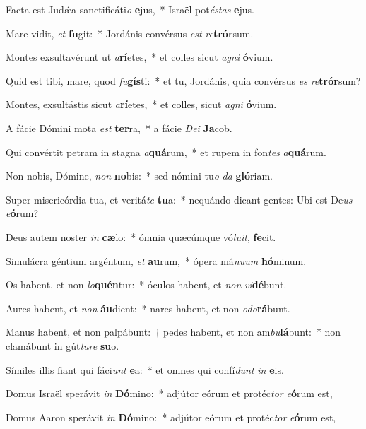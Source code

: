 \item Facta est Judǽa sanctificáti\textit{o} \textbf{e}jus,~* Israël pot\textit{és}\textit{tas} \textbf{e}jus.
\item Mare vidit, \textit{et} \textbf{fu}git:~* Jordánis convérsus \textit{est} \textit{re}\textbf{trór}sum.
\item Montes exsultavérunt ut \textit{a}\textbf{rí}etes,~* et colles sicut \textit{a}\textit{gni} \textbf{ó}vium.
\item Quid est tibi, mare, quod \textit{fu}\textbf{gís}ti:~* et tu, Jordánis, quia convérsus \textit{es} \textit{re}\textbf{trór}sum?
\item Montes, exsultástis sicut \textit{a}\textbf{rí}etes,~* et colles, sicut \textit{a}\textit{gni} \textbf{ó}vium.
\item A fácie Dómini mota \textit{est} \textbf{ter}ra,~* a fácie \textit{De}\textit{i} \textbf{Ja}cob.
\item Qui convértit petram in stagna \textit{a}\textbf{quá}rum,~* et rupem in fon\textit{tes} \textit{a}\textbf{quá}rum.
\item Non nobis, Dómine, \textit{non} \textbf{no}bis:~* sed nómini tu\textit{o} \textit{da} \textbf{gló}riam.
\item Super misericórdia tua, et veritá\textit{te} \textbf{tu}a:~* nequándo dicant gentes: Ubi est De\textit{us} \textit{e}\textbf{ó}rum?
\item Deus autem noster \textit{in} \textbf{cæ}lo:~* ómnia quæcúmque vó\textit{lu}\textit{it}, \textbf{fe}cit.
\item Simulácra géntium argéntum, \textit{et} \textbf{au}rum,~* ópera má\textit{nu}\textit{um} \textbf{hó}minum.
\item Os habent, et non \textit{lo}\textbf{quén}tur:~* óculos habent, et \textit{non} \textit{vi}\textbf{dé}bunt.
\item Aures habent, et \textit{non} \textbf{áu}dient:~* nares habent, et non \textit{o}\textit{do}\textbf{rá}bunt.
\item Manus habent, et non palpábunt:~† pedes habent, et non am\textit{bu}\textbf{lá}bunt:~* non clamábunt in gút\textit{tu}\textit{re} \textbf{su}o.
\item Símiles illis fiant qui fáci\textit{unt} \textbf{e}a:~* et omnes qui confí\textit{dunt} \textit{in} \textbf{e}is.
\item Domus Israël sperávit \textit{in} \textbf{Dó}mino:~* adjútor eórum et protéc\textit{tor} \textit{e}\textbf{ó}rum est,
\item Domus Aaron sperávit \textit{in} \textbf{Dó}mino:~* adjútor eórum et protéc\textit{tor} \textit{e}\textbf{ó}rum est,
